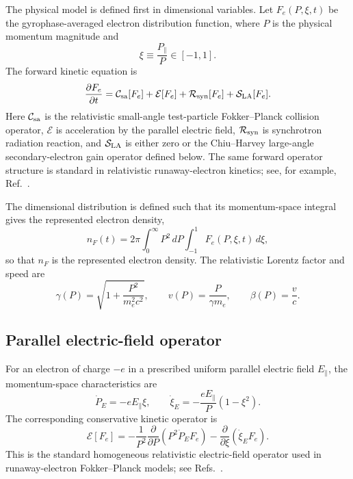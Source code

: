 \documentclass[11pt]{article}
\begin{document}
The physical model is defined first in dimensional variables.  Let
$F_e(P,\xi,t)$ be the gyrophase-averaged electron distribution function, where $P$ is
the physical momentum magnitude and
\begin{equation}
 \xi \equiv \frac{P_\parallel}{P}\in[-1,1].
\end{equation}
The forward kinetic equation is
\begin{equation}
 \frac{\partial F_e}{\partial t}
 = \mathcal C_{\rm sa}[F_e]
 + \mathcal E[F_e]
 + \mathcal R_{\rm syn}[F_e]
 + \mathcal S_{\rm LA}[F_e].
 \label{eq:dimensional_kinetic}
\end{equation}
Here $\mathcal C_{\rm sa}$ is the relativistic small-angle test-particle
Fokker--Planck collision operator, $\mathcal E$ is acceleration by the parallel
electric field, $\mathcal R_{\rm syn}$ is synchrotron radiation reaction, and
$\mathcal S_{\rm LA}$ is either zero or the Chiu--Harvey large-angle
secondary-electron gain operator defined below.  The same forward operator structure is standard in relativistic runaway-electron
kinetics; see, for example, Ref.~\cite{BraamsKarney1989}.

The dimensional distribution is defined such that its momentum-space integral gives the
represented electron density,
\begin{equation}
 n_F(t)
 = 2\pi\int_0^\infty P^2\,dP\int_{-1}^{1}F_e(P,\xi,t)\,d\xi,
 \label{eq:dimensional_density}
\end{equation}
so that $n_F$ is the represented electron density.  The relativistic Lorentz factor
and speed are
\begin{equation}
 \gamma(P)=\sqrt{1+\frac{P^2}{m_e^2c^2}},
 \qquad
 v(P)=\frac{P}{\gamma m_e},
 \qquad
 \beta(P)=\frac{v}{c}.
 \label{eq:dimensional_kinematics}
\end{equation}

\subsection{Parallel electric-field operator}

For an electron of charge $-e$ in a prescribed uniform parallel electric field
$E_\parallel$, the momentum-space characteristics are
\begin{equation}
 \dot P_E=-eE_\parallel\xi,
 \qquad
 \dot\xi_E=-\frac{eE_\parallel}{P}(1-\xi^2).
 \label{eq:electric_characteristics}
\end{equation}
The corresponding conservative kinetic operator is
\begin{equation}
 \mathcal E[F_e]
 =-\frac{1}{P^2}\frac{\partial}{\partial P}
   \left(P^2\dot P_E F_e\right)
  -\frac{\partial}{\partial\xi}
   \left(\dot\xi_E F_e\right).
 \label{eq:electric_operator_dimensional}
\end{equation}
This is the standard homogeneous relativistic electric-field operator used in
runaway-electron Fokker--Planck models; see
Refs.~\cite{ConnorHastie1975}.
\end{document}
